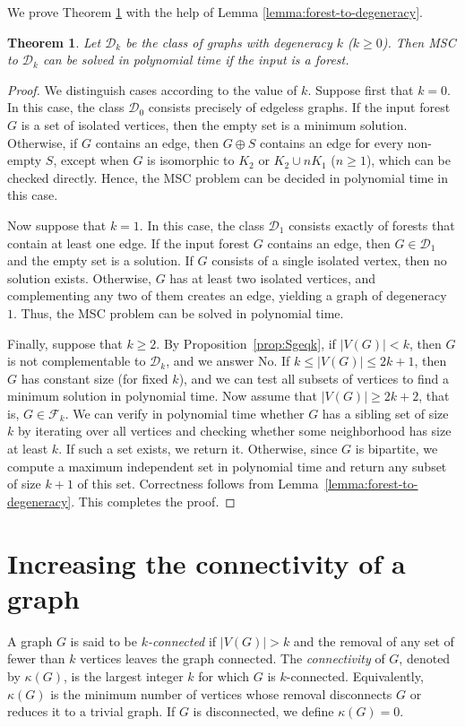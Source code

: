 \documentclass[11pt]{article}
\newtheorem{theorem}{Theorem}
\theoremstyle{definition}
\begin{document}
We prove Theorem \ref{thm:forest-degenerate} with the help of Lemma \ref{lemma:forest-to-degeneracy}.

\begin{theorem}
\label{thm:forest-degenerate}
Let $\mathcal{D}_k$ be the class of graphs with degeneracy $k$ ($k \geq 0$).  
Then MSC to $\mathcal{D}_k$ can be solved in polynomial time if the input is a forest.
\end{theorem}
\begin{proof}  
We distinguish cases according to the value of $k$.
Suppose first that $k=0$. In this case, the class $\mathcal{D}_0$ consists precisely of edgeless graphs. If the input forest $G$ is a set of isolated vertices, then the empty set is a minimum solution.
Otherwise, if $G$ contains an edge, then $G \oplus S$ contains an edge for every non-empty $S$,
except when $G$ is isomorphic to $K_2$ or $K_2 \cup nK_1$ ($n\geq 1$),
which can be checked directly.
Hence, the MSC problem can be decided in polynomial time in this case.

Now suppose that $k=1$.
In this case, the class $\mathcal{D}_1$ consists exactly of forests that contain at least one edge.
If the input forest $G$ contains an edge, then $G \in \mathcal{D}_1$ and the empty set is a solution.
If $G$ consists of a single isolated vertex, then no solution exists.
Otherwise, $G$ has at least two isolated vertices, and complementing any two of them creates an edge,
yielding a graph of degeneracy~$1$.
Thus, the MSC problem can be solved in polynomial time.


Finally, suppose that $k \geq 2$.
By Proposition~\ref{prop:Sgeqk}, if $|V(G)| < k$, then $G$ is not complementable to $\mathcal{D}_k$,
and we answer No.
If $k \leq |V(G)| \leq 2k+1$, then $G$ has constant size (for fixed $k$),
and we can test all subsets of vertices to find a minimum solution in polynomial time.
Now assume that $|V(G)| \geq 2k+2$, that is, $G \in \mathcal{F}_k$.
We can verify in polynomial time whether $G$ has a sibling set of size $k$
by iterating over all vertices and checking whether some neighborhood has size at least $k$.
If such a set exists, we return it.
Otherwise, since $G$ is bipartite, we compute a maximum independent set in polynomial time
and return any subset of size $k+1$ of this set.
Correctness follows from Lemma~\ref{lemma:forest-to-degeneracy}.
This completes the proof.
\end{proof}




\section{Increasing the connectivity of a graph}
\label{section:increasing-connectivity}
A graph \( G \) is said to be \emph{\(k\)-connected} if \( |V(G)| > k \) and the removal of any set of fewer than \( k \) vertices leaves the graph connected.  
The \emph{connectivity} of \( G \), denoted by \( \kappa(G) \), is the largest integer \( k \) for which \( G \) is \(k\)-connected. Equivalently, \( \kappa(G) \) is the minimum number of vertices whose removal disconnects \( G \) or reduces it to a trivial graph. If \( G \) is disconnected, we define \( \kappa(G) = 0 \).
\end{document}
